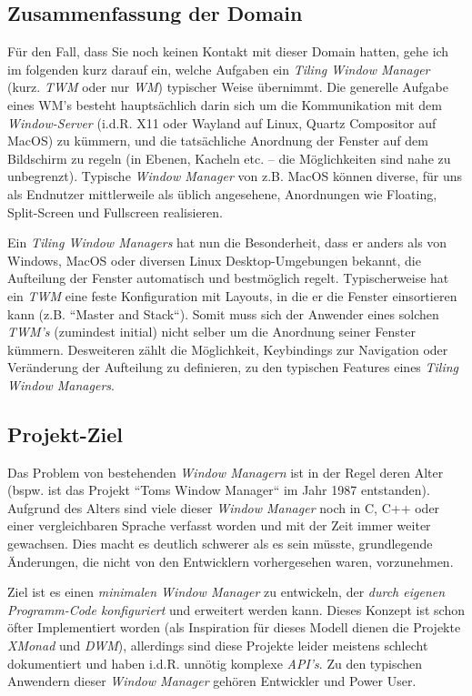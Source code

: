 \documentclass{article}
\begin{document}
\subsection{Zusammenfassung der Domain}

Für den Fall, dass Sie noch keinen Kontakt mit dieser Domain hatten, gehe ich im folgenden kurz darauf ein,
welche Aufgaben ein \emph{Tiling Window Manager} (kurz. \emph{TWM} oder nur \emph{WM}) typischer Weise
übernimmt. Die generelle Aufgabe eines WM's besteht hauptsächlich darin sich um die Kommunikation mit dem
\emph{Window-Server} (i.d.R. X11 oder Wayland auf Linux, Quartz Compositor auf MacOS) zu kümmern, und die
tatsächliche Anordnung der Fenster auf dem Bildschirm zu regeln (in Ebenen, Kacheln etc. – die Möglichkeiten
sind nahe zu unbegrenzt). Typische \emph{Window Manager} von z.B. MacOS können diverse, für uns als Endnutzer
mittlerweile als üblich angesehene, Anordnungen wie Floating, Split-Screen und Fullscreen realisieren. \par
Ein \emph{Tiling Window Managers} hat nun die Besonderheit, dass er anders als von Windows, MacOS oder diversen
Linux Desktop-Umgebungen bekannt, die Aufteilung der Fenster automatisch und bestmöglich regelt. Typischerweise
hat ein \emph{TWM} eine feste Konfiguration mit Layouts, in die er die Fenster einsortieren kann (z.B. ``Master
and Stack``). Somit muss sich der Anwender eines solchen \emph{TWM's} (zumindest initial) nicht selber um die
Anordnung seiner Fenster kümmern. Desweiteren zählt die Möglichkeit, Keybindings zur Navigation oder Veränderung
der Aufteilung zu definieren, zu den typischen Features eines \emph{Tiling Window Managers}.

\subsection{Projekt-Ziel}

Das Problem von bestehenden \emph{Window Managern} ist in der Regel deren Alter (bspw. ist das Projekt ``Toms
Window Manager`` im Jahr 1987 entstanden). Aufgrund des Alters sind viele dieser \emph{Window Manager} noch in
C, C++ oder einer vergleichbaren Sprache verfasst worden und mit der Zeit immer weiter gewachsen. Dies macht es
deutlich schwerer als es sein müsste, grundlegende Änderungen, die nicht von den Entwicklern vorhergesehen waren,
vorzunehmen. \par
Ziel ist es einen \emph{minimalen Window Manager} zu entwickeln, der \emph{durch eigenen Programm-Code konfiguriert}
und erweitert werden kann. Dieses Konzept ist schon öfter Implementiert worden (als Inspiration für dieses Modell
dienen die Projekte \emph{XMonad\footnotemark} und \emph{DWM\footnotemark}), allerdings sind diese Projekte leider
meistens schlecht dokumentiert und haben i.d.R. unnötig komplexe \emph{API's}. Zu den typischen Anwendern dieser
\emph{Window Manager} gehören Entwickler und Power User.
\end{document}
